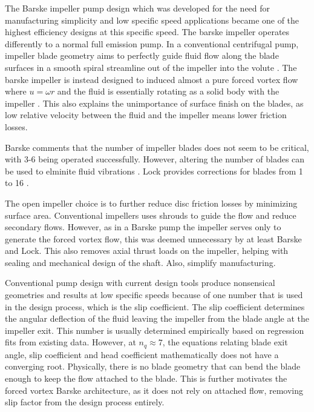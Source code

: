 The Barske impeller pump design which was developed for the need for manufacturing simplicity and low specific speed applications became one of the highest efficiency designs at this specific speed.  The barske impeller operates differently to a normal full emission pump. In a conventional centrifugal pump, impeller blade geometry aims to perfectly guide fluid flow along the blade surfaces in a smooth spiral streamline out of the impeller into the volute \cite{something}. The barske impeller is instead designed to induced almost a pure forced vortex flow where $u=\omega r$ and the fluid is essentially rotating as a solid body with the impeller \cite{barske unconventional paper}. This also explains the unimportance of surface finish on the blades, as low relative velocity between the fluid and the impeller means lower friction losses. 


Barske comments that the number of impeller blades does not seem to be critical, with 3-6 being operated successfully. However, altering the number of blades can be used to elminite fluid vibrations \cite{barske 1953}. Lock provides corrections for blades from 1 to 16 \cite{lock fig 10A}.

The open impeller choice is to further reduce disc friction losses  by minimizing surface area. Conventional impellers uses shrouds to guide the flow and reduce secondary flows. However, as in a Barske pump the impeller serves only to generate the forced vortex flow, this was deemed unnecessary by at least Barske and Lock. This also removes axial thrust loads on the impeller, helping with sealing and mechanical design of the shaft. Also, simplify manufacturing.

Conventional pump design with current design tools produce nonsensical geometries and results at low specific speeds because of one number that is used in the design process, which is the slip coefficient. The slip coefficient determines the angular deflection of the fluid leaving the impeller from the blade angle at the impeller exit. This number is usually determined empirically based on regression fits from existing data. However, at $n_q\approx 7$, the equations relating blade exit angle, slip coefficient and head coefficient mathematically does not have a converging root. Physically, there is no blade geometry that can bend the blade enough to keep the flow attached to the blade. This is further motivates the forced vortex Barske architecture, as it does not rely on attached flow, removing slip factor from the design process entirely.

